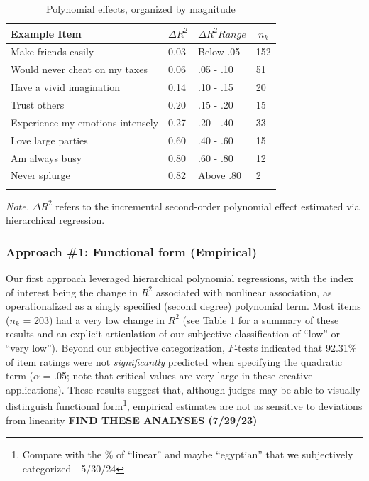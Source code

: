 \documentclass[
  ,jou]{apa6}
\begin{document}
\begin{table}[tbp]

\begin{center}
\begin{threeparttable}

\caption{\label{tab:polytable}Polynomial effects, organized by magnitude}

\begin{tabular}{llll}
\toprule
Example Item & \multicolumn{1}{c}{$\Delta R^2$} & \multicolumn{1}{c}{$\Delta R^2 Range$} & \multicolumn{1}{c}{$n_k$}\\
\midrule
Make friends easily & 0.03 & Below .05 & 152\\
Would never cheat on my taxes & 0.06 & .05 - .10 & 51\\
Have a vivid imagination & 0.14 & .10 - .15 & 20\\
Trust others & 0.20 & .15 - .20 & 15\\
Experience my emotions intensely & 0.27 & .20 - .40 & 33\\
Love large parties & 0.60 & .40 - .60 & 15\\
Am always busy & 0.80 & .60 - .80 & 12\\
Never splurge & 0.82 & Above .80 & 2\\
\bottomrule
\addlinespace
\end{tabular}

\begin{tablenotes}[para]
\normalsize{\textit{Note.} $\Delta R^2$ refers to the incremental second-order polynomial effect estimated via hierarchical regression.}
\end{tablenotes}

\end{threeparttable}
\end{center}

\end{table}

\hypertarget{approach-1-functional-form-empirical}{%
\subsubsection{Approach \#1: Functional form (Empirical)}\label{approach-1-functional-form-empirical}}

Our first approach leveraged hierarchical polynomial regressions, with the index of interest being the change in \(R^2\) associated with nonlinear association, as operationalized as a singly specified (second degree) polynomial term. Most items (\(n_k\) = 203) had a very low change in \(R^2\) (see Table \ref{tab:polytable} for a summary of these results and an explicit articulation of our subjective classification of ``low'' or ``very low''). Beyond our subjective categorization, \(F\)-tests indicated that 92.31\% of item ratings were not \emph{significantly} predicted when specifying the quadratic term (\(\alpha\) = .05; note that critical values are very large in these creative applications). These results suggest that, although judges may be able to visually distinguish functional form\footnote{Compare with the \% of ``linear'' and maybe ``egyptian'' that we subjectively categorized - 5/30/24}, empirical estimates are not as sensitive to deviations from linearity \textbf{FIND THESE ANALYSES (7/29/23)}
\end{document}
